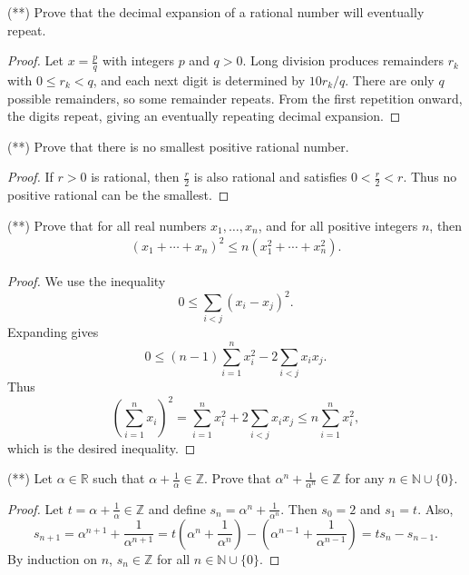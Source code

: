 \documentclass[12pt]{article}
\begin{document}
\begin{problem}
(**) Prove that the decimal expansion of a rational number will eventually repeat.
\begin{proof}
Let $x=\frac{p}{q}$ with integers $p$ and $q>0$. Long division produces remainders $r_k$ with $0\le r_k<q$, and each next digit is determined by $10r_k/q$. There are only $q$ possible remainders, so some remainder repeats. From the first repetition onward, the digits repeat, giving an eventually repeating decimal expansion.
\end{proof}
\end{problem}

\begin{problem}
(**) Prove that there is no smallest positive rational number.
\begin{proof}
If $r>0$ is rational, then $\frac{r}{2}$ is also rational and satisfies $0<\frac{r}{2}<r$. Thus no positive rational can be the smallest.
\end{proof}
\end{problem}

\begin{problem}
(**) Prove that for all real numbers $x_1, \ldots, x_n$, and for all positive integers $n$, then
\begin{align*}
    (x_1 + \cdots + x_n)^2 \leq n (x_1^2 + \cdots + x_n^2).
\end{align*}
\begin{proof}
We use the inequality
\[
0\le \sum_{i<j}(x_i-x_j)^2.
\]
Expanding gives
\[
0\le (n-1)\sum_{i=1}^n x_i^2-2\sum_{i<j}x_ix_j.
\]
Thus
\[
\left(\sum_{i=1}^n x_i\right)^2=\sum_{i=1}^n x_i^2+2\sum_{i<j}x_ix_j\le n\sum_{i=1}^n x_i^2,
\]
which is the desired inequality.
\end{proof}
\end{problem}

\begin{problem}
(**) Let $\alpha\in\mathbb{R}$ such that $\alpha+\frac{1}{\alpha}\in\mathbb{Z}$. Prove that $\alpha^n+\frac{1}{\alpha^n}\in\mathbb{Z}$ for any $n\in\mathbb{N}\cup\{0\}$.
\begin{proof}
Let $t=\alpha+\frac{1}{\alpha}\in\mathbb{Z}$ and define $s_n=\alpha^n+\frac{1}{\alpha^n}$. Then $s_0=2$ and $s_1=t$. Also,
\[
s_{n+1}=\alpha^{n+1}+\frac{1}{\alpha^{n+1}}=t\left(\alpha^n+\frac{1}{\alpha^n}\right)-\left(\alpha^{n-1}+\frac{1}{\alpha^{n-1}}\right)=ts_n-s_{n-1}.
\]
By induction on $n$, $s_n\in\mathbb{Z}$ for all $n\in\mathbb{N}\cup\{0\}$.
\end{proof}
\end{problem}
\end{document}
